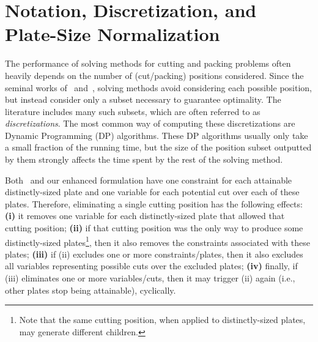 \documentclass[smallextended]{svjour3}       %
\begin{document}

\section{Notation, Discretization, and Plate-Size Normalization}
\label{sec:psn}

The performance of solving methods for cutting and packing problems often heavily depends on the number of (cut/packing) positions considered.
Since the seminal works of~\cite{nicos:1977} and~\cite{herz:1972}, solving methods avoid considering each possible position, but instead consider only a subset necessary to guarantee optimality.
The literature includes many such subsets, which are often referred to as \emph{discretizations}.
The most common way of computing these discretizations are Dynamic Programming (DP) algorithms.
These DP algorithms usually only take a small fraction of the running time, but the size of the position subset outputted by them strongly affects the time spent by the rest of the solving method.

Both~\cite{furini:2016} and our enhanced formulation have one constraint for each attainable distinctly-sized plate and one variable for each potential cut over each of these plates.
Therefore, eliminating a single cutting position has the following effects:
\textbf{(i)} it removes one variable for each distinctly-sized plate that allowed that cutting position;
\textbf{(ii)} if that cutting position was the only way to produce some distinctly-sized plates\footnote{Note that the same cutting position, when applied to distinctly-sized plates, may generate different children.}, then it also removes the constraints associated with these plates;
\textbf{(iii)} if (ii) excludes one or more constraints/plates, then it also excludes all variables representing possible cuts over the excluded plates;
\textbf{(iv)} finally, if (iii) eliminates one or more variables/cuts, then it may trigger (ii) again (i.e., other plates stop being attainable), cyclically.
\end{document}
